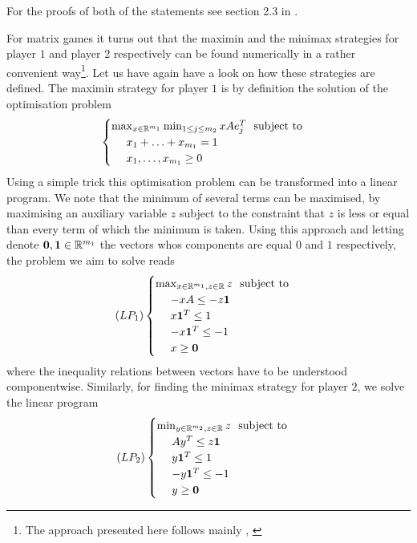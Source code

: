 For the proofs of both of the statements see section 2.3 in \cite{gonzalez2010introductory}.

For matrix games it turns out that the maximin and the minimax strategies for player $1$ and player $2$ respectively can be found numerically in a 
rather convenient way\footnote{The approach presented here follows mainly \cite{lavrov}, \cite{mansour}}. Let us have again have a look on how these
 strategies are defined. The maximin strategy for player $1$ is by definition the solution of the optimisation problem
\begin{align*}
    \begin{cases}
        \max_{x\in\mathbb{R}^{m_{1}}}\min_{1\leq j\leq m_{2}}xAe_{j}^{T} ~\text{ subject to}\\   
        ~~~~ x_{1} + \ldots + x_{m_{1}} = 1\\
        ~~~~ x_{1}, \ldots, x_{m_{1}}\geq 0
    \end{cases}
\end{align*}
Using a simple trick this optimisation problem can be transformed into a linear program. We note that the minimum of several terms can be 
maximised, by maximising an auxiliary variable $z$ subject to the constraint that $z$ is less or equal than every term of which the minimum is taken.
Using this approach and letting denote $\mathbf{0}, \mathbf{1}\in\mathbb{R}^{m_{1}}$ the vectors whos components are equal $0$ and $1$ respectively, the
problem we aim to solve reads
\begin{align*}
    (LP_{1})
    \begin{cases}
        \max_{x\in\mathbb{R}^{m_{1}}, z\in\mathbb{R}}z ~\text{ subject to}\\   
        ~~~~  - xA \leq -z\mathbf{1}\\
        ~~~~ x\mathbf{1}^{T} \leq 1\\
        ~~~~ -x\mathbf{1}^{T} \leq -1\\
        ~~~~ x\geq \mathbf{0}
    \end{cases}
\end{align*}
where the inequality relations between vectors have to be understood componentwise. Similarly, for finding the minimax strategy for player $2$, we 
solve the linear program
\begin{align*}
    (LP_{2})
    \begin{cases}
        \min_{y\in\mathbb{R}^{m_{2}}, z\in\mathbb{R}}z ~\text{ subject to}\\   
        ~~~~ Ay^{T} \leq z\mathbf{1}\\
        ~~~~ y\mathbf{1}^{T} \leq 1\\
        ~~~~ -y\mathbf{1}^{T} \leq -1\\
        ~~~~ y\geq \mathbf{0}
    \end{cases}
\end{align*}

